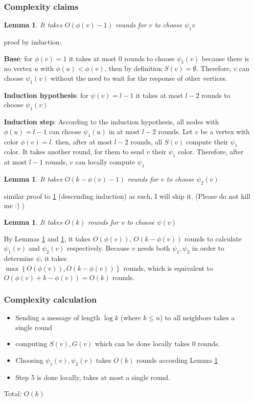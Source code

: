 \documentclass[11pt]{article}
\newtheorem{lemma}[theorem]{Lemma}
\begin{document}
\subsubsection*{Complexity claims}

\begin{lemma}
\label{psi_1_rounds}
It takes $O(\phi(v) -1)$ rounds for $v$ to choose $\psi_1{v}$
\end{lemma}
proof by induction: 

\textbf{Base}: for $\phi(v)=1$ it takes at most 0 rounds to choose $\psi_1(v)$
because there is no vertex $u$ with $\phi(u) < \phi(v)$, then by definition $S(v)=\emptyset$. Therefore, $v$ can choose $\psi_1(v)$ without the need to wait for the response of other vertices.

\textbf{Induction hypothesis}: for $\psi(v)=l-1$ it takes at most $l-2$ rounds to choose $\psi_1(v)$

\textbf{Induction step}: According to the induction hypothesis, all nodes with $\phi(u)=l-1$ can choose $\psi_1(u)$ in at most $l-2$ rounds. Let $v$ be a vertex with color $\phi(v)=l$. then, after at most $l-2$ rounds, all $S(v)$ compute their $\psi_1$ color. It takes another round, for them to send $v$ their $\psi_1$ color. Therefore, after at most $l-1$ rounds, $v$ can locally compute $\psi_1$

\begin{lemma}
\label{psi_2_rounds}
It takes $O(k -\phi(v) -1 )$ rounds for $v$ to choose $\psi_2(v)$
\end{lemma}
similar proof to \ref{psi_1_rounds} (descending induction) as such, I will skip it. (Please do not kill me :) )

\begin{lemma}
\label{psi_rounds}
It takes $O(k)$ rounds for $v$ to choose $\psi(v)$
\end{lemma}
By Lemmas \ref{psi_1_rounds} and \ref{psi_2_rounds}, it takes $O(\phi(v))$, $O(k- \phi(v))$  rounds to calculate $\psi_1(v)$ and $\psi_2(v)$ respectively. Because $v$ needs both $\psi_1, \psi_2$ in order to determine $\psi$, it takes \\
$\max \left\{ O(\phi(v)), O(k- \phi(v)) \right\}$
rounds, which is equivalent to $O(\phi(v) + k- \phi(v))=O(k)$ rounds.


\subsubsection*{Complexity calculation}
\begin{itemize}
    \item Sending a message of length $\log{k}$ (where $k \le n$) to all neighbors takes a single round
    \item computing $S(v), G(v)$ which can be done locally takes 0 rounds.
    \item Choosing $\psi_1(v), \psi_2(v)$ takes $O(k)$ rounds according Lemma \ref{psi_rounds}
    \item Step 5 is done locally, takes at most a single round.
\end{itemize}
Total: $O(k)$
\end{document}
